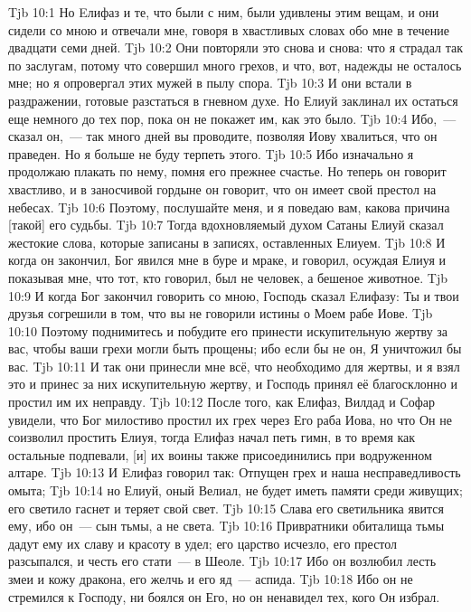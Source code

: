 \vs Tjb 10:1
Но Eлифаз и те, что были с ним, были удивлены этим вещам, и они сидели со мною и отвечали мне, говоря в хвастливых словах обо мне в течение двадцати семи дней.
\vs Tjb 10:2
Они повторяли это снова и снова: что я страдал так по заслугам, потому что совершил много грехов, и что, вот, надежды не осталось мне; но я опровергал этих мужей в пылу спора.
\vs Tjb 10:3
И они встали в раздражении, готовые разстаться в гневном духе. Но Елиуй заклинал их остаться еще немного до тех пор, пока он не покажет им, как это было.
\vs Tjb 10:4
Ибо,~--- сказал он,~--- так много дней вы проводите, позволяя Иову хвалиться, что он праведен. Но я больше не буду терпеть этого.
\vs Tjb 10:5
Ибо изначально я продолжаю плакать по нему, помня его прежнее счастье. Но теперь он говорит хвастливо, и в заносчивой гордыне он говорит, что он имеет свой престол на небесах.
\vs Tjb 10:6
Поэтому, послушайте меня, и я поведаю вам, какова причина [такой] его судьбы.
\vs Tjb 10:7
Тогда вдохновляемый духом Сатаны Елиуй сказал жестокие слова, которые записаны в записях, оставленных Елиуем.
\vs Tjb 10:8
И когда он закончил, Бог явился мне в буре и мраке, и говорил, осуждая Елиуя и показывая мне, что тот, кто говорил, был не человек, а бешеное животное.
\vs Tjb 10:9
И когда Бог закончил говорить со мною, Господь сказал Eлифазу: Ты и твои друзья согрешили в том, что вы не говорили истины о Моем рабе Иове.
\vs Tjb 10:10
Поэтому поднимитесь и побудите его принести искупительную жертву за вас, чтобы ваши грехи могли быть прощены; ибо если бы не он, Я уничтожил бы вас.
\vs Tjb 10:11
И так они принесли мне всё, что необходимо для жертвы, и я взял это и принес за них искупительную жертву, и Господь принял её благосклонно и простил им их неправду.
\vs Tjb 10:12
После того, как Елифаз, Вилдад и Софар увидели, что Бог милостиво простил их грех через Его раба Иова, но что Он не соизволил простить Елиуя, тогда Eлифаз начал петь гимн, в то время как остальные подпевали, [и] их воины также присоединились при водруженном алтаре.
\vs Tjb 10:13
И Eлифаз говорил так: Отпущен грех и наша несправедливость омыта;
\vs Tjb 10:14
но Елиуй, оный Велиал, не будет иметь памяти среди живущих; его светило гаснет и теряет свой свет.
\vs Tjb 10:15
Слава его светильника явится ему, ибо он~--- сын тьмы, а не света.
\vs Tjb 10:16
Привратники обиталища тьмы дадут ему их славу и красоту в удел; его царство исчезло, его престол разсыпался, и честь его стати~--- в Шеоле.
\vs Tjb 10:17
Ибо он возлюбил лесть змеи и кожу дракона, его желчь и его яд~--- аспида.
\vs Tjb 10:18
Ибо он не стремился к Господу, ни боялся он Его, но он ненавидел тех, кого Он избрал.
